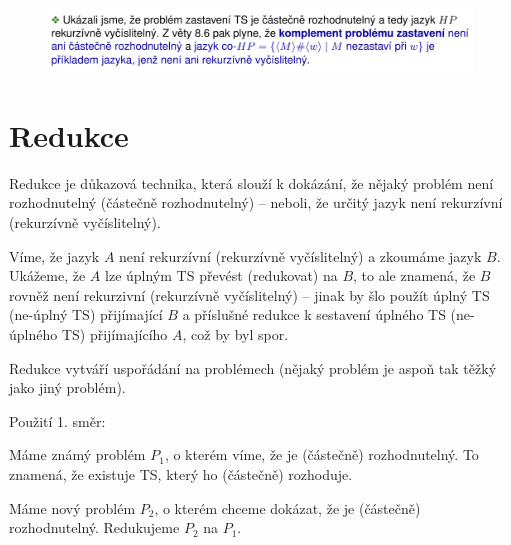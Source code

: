 \begin{figure}[H]
    \centering
    \includegraphics[width=1\linewidth]{diagonalizace_pr3_p4.pdf}
\end{figure}


\section{Redukce}

\begin{compactitem}

    \item Redukce je důkazová technika, která slouží k dokázání, že nějaký problém není rozhodnutelný (částečně rozhodnutelný) -- neboli, že určitý jazyk není rekurzívní (rekurzívně vyčíslitelný). \begin{compactitem}
        \item Víme, že jazyk $A$ není rekurzívní (rekurzívně vyčíslitelný) a zkoumáme jazyk $B$. Ukážeme, že $A$ lze úplným TS převést (redukovat) na $B$, to ale znamená, že $B$ rovněž není rekurzivní (rekurzívně vyčíslitelný) -- jinak by šlo použít úplný TS (ne-úplný TS) přijímající $B$ a příslušné redukce k sestavení úplného TS (ne-úplného TS) přijímajícího $A$, což by byl spor.
    \end{compactitem}

    \item Redukce vytváří uspořádání na problémech (nějaký problém je aspoň tak těžký jako jiný problém).


    \item Použití 1. směr: \begin{compactitem}
        \item Máme známý problém $P_1$, o kterém víme, že je (částečně) rozhodnutelný. To znamená, že existuje TS, který ho (částečně) rozhoduje.

        \item Máme nový problém $P_2$, o kterém chceme dokázat, že je (částečně) rozhodnutelný. Redukujeme $P_2$ na $P_1$.


\end{compactitem}
\end{compactitem}
